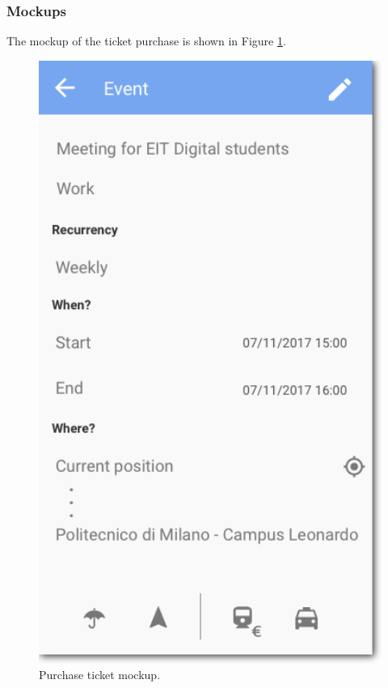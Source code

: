 \subsubsection{Mockups}
The mockup of the ticket purchase is shown in Figure \ref{fig:seqPurchaseTicket}.
\begin{figure}
	\centering
    \includegraphics[width=4.5in]{./images/event.png}
    \caption{Purchase ticket mockup.}
    \label{fig:seqPurchaseTicket}
\end{figure}